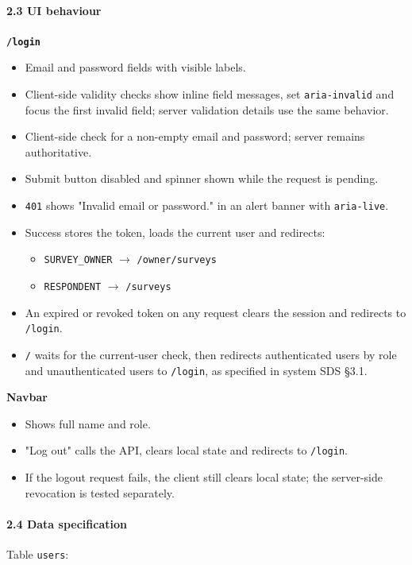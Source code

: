 \documentclass[12pt,a4paper]{article}
\begin{document}
\paragraph*{2.3 UI behaviour}
\textbf{\texttt{/login}}

\begin{itemize}[leftmargin=*]
\item Email and password fields with visible labels.
\item Client-side validity checks show inline field messages, set \texttt{aria-invalid} and focus the first invalid field; server validation details use the same behavior.
\item Client-side check for a non-empty email and password; server remains authoritative.
\item Submit button disabled and spinner shown while the request is pending.
\item \texttt{401} shows "Invalid email or password." in an alert banner with \texttt{aria-live}.
\item Success stores the token, loads the current user and redirects:
\begin{itemize}[leftmargin=*]
\item \texttt{SURVEY\_OWNER} $\rightarrow$ \texttt{/owner/surveys}
\item \texttt{RESPONDENT} $\rightarrow$ \texttt{/surveys}
\end{itemize}
\item An expired or revoked token on any request clears the session and redirects to \texttt{/login}.
\item \texttt{/} waits for the current-user check, then redirects authenticated users by role and unauthenticated users to \texttt{/login}, as specified in system SDS \S{}3.1.
\end{itemize}

\textbf{Navbar}

\begin{itemize}[leftmargin=*]
\item Shows full name and role.
\item "Log out" calls the API, clears local state and redirects to \texttt{/login}.
\item If the logout request fails, the client still clears local state; the server-side revocation is tested separately.
\end{itemize}

\paragraph*{2.4 Data specification}
Table \texttt{users}:
\end{document}
